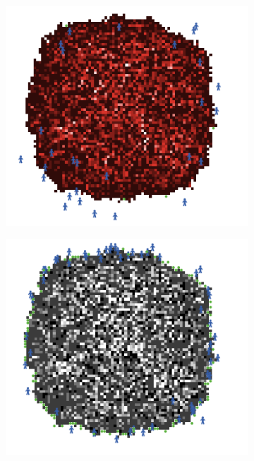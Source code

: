 \documentclass{article}
\begin{document}
\begin{figure}[H]

  \begin{subfigure}{.5\textwidth}
    \centering
    \includegraphics[width=.8\linewidth]{pictures/sensibilite_faible_ennui_complexite.png}
  \end{subfigure}
  \begin{subfigure}{.5\textwidth}
    \centering
    \includegraphics[width=.8\linewidth]{pictures/sensibilite_faible_ennui_sante.png}
  \end{subfigure}
  \begin{subfigure}{.5\textwidth}
    \centering

\end{subfigure}
\end{figure}
\end{document}
